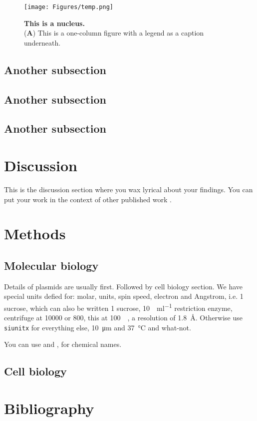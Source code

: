 \lipsum[11]

\begin{figure}
\centering
\texttt{[image: Figures/temp.png]}
\caption{\textbf{This is a nucleus.}\\
(\textbf{A}) This is a one-column figure with a legend as a caption underneath.}
\label{fig:nucleus}
\end{figure}

\lipsum[12]

\subsection*{Another subsection}

\lipsum[13-14]

\subsection*{Another subsection}

\lipsum[13-14]

\subsection*{Another subsection}

\lipsum[13-14]

\section*{Discussion}\label{s:discussion}

This is the discussion section where you wax lyrical about your findings.
You can put your work in the context of other published work \citep{brenner_uga:_1967}.

\lipsum[100-104]

\section*{Methods}\label{s:methods}

\subsection*{Molecular biology}

Details of plasmids are usually first.
Followed by cell biology section.
We have special units defied for: molar, units, spin speed, electron and Angstrom, i.e. \SI{1}{\Molar} sucrose, which can also be written \SI{1}{\molar} sucrose, \SI{10}{\Units\per\milli\litre} restriction enzyme, centrifuge at \SI{10000}{\gee} or \SI{800}{\rpm}, this at \SI{100}{\kilo\electron}, a resolution of \SI{1.8}{\angstrom}.
Otherwise use \texttt{siunitx} for everything else, \SI{10}{\micro\metre} and \SI{37}{\degreeCelsius} and what-not.

You can use  and , for chemical names.

\subsection*{Cell biology}

\lipsum[80]

\section*{Bibliography}

